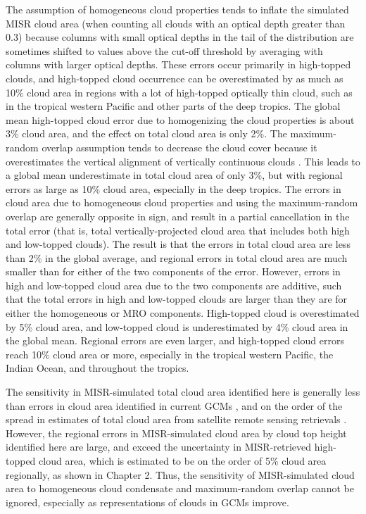 The assumption of homogeneous cloud properties tends to inflate the
simulated MISR cloud area (when counting all clouds with an optical
depth greater than 0.3) because columns with small optical depths in the
tail of the distribution are sometimes shifted to values above the
cut-off threshold by averaging with columns with larger optical depths.
These errors occur primarily in high-topped clouds, and high-topped
cloud occurrence can be overestimated by as much as 10\% cloud area in
regions with a lot of high-topped optically thin cloud, such as in the
tropical western Pacific and other parts of the deep tropics. The global
mean high-topped cloud error due to homogenizing the cloud properties is
about 3\% cloud area, and the effect on total cloud area is only 2\%.
The maximum-random overlap assumption tends to decrease the cloud cover
because it overestimates the vertical alignment of vertically continuous
clouds
\citep{mace_and_benson-troth_2002, hogan_and_illingworth_2000, barker_2008}.
This leads to a global mean underestimate in total cloud area of only
3\%, but with regional errors as large as 10\% cloud area, especially in
the deep tropics. The errors in cloud area due to homogeneous cloud
properties and using the maximum-random overlap are generally opposite
in sign, and result in a partial cancellation in the total error (that
is, total vertically-projected cloud area that includes both high and
low-topped clouds). The result is that the errors in total cloud area
are less than 2\% in the global average, and regional errors in total
cloud area are much smaller than for either of the two components of the
error. However, errors in high and low-topped cloud area due to the two
components are additive, such that the total errors in high and
low-topped clouds are larger than they are for either the homogeneous or
MRO components. High-topped cloud is overestimated by 5\% cloud area,
and low-topped cloud is underestimated by 4\% cloud area in the global
mean. Regional errors are even larger, and high-topped cloud errors
reach 10\% cloud area or more, especially in the tropical western
Pacific, the Indian Ocean, and throughout the tropics.

The sensitivity in MISR-simulated total cloud area identified here is
generally less than errors in cloud area identified in current GCMs
\citep{kay_et_al_2012, klein_et_al_2013, bodas-salcedo_et_al_2011}, and
on the order of the spread in estimates of total cloud area from
satellite remote sensing retrievals
\citep{marchand_et_al_2010, pincus_et_al_2012}. However, the regional
errors in MISR-simulated cloud area by cloud top height identified here
are large, and exceed the uncertainty in MISR-retrieved high-topped
cloud area, which is estimated to be on the order of 5\% cloud area
regionally, as shown in Chapter 2. Thus, the sensitivity of
MISR-simulated cloud area to homogeneous cloud condensate and
maximum-random overlap cannot be ignored, especially as representations
of clouds in GCMs improve.

